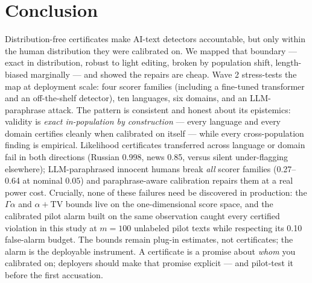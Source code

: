 \documentclass[11pt]{article}
\begin{document}
\section{Conclusion}
Distribution-free certificates make AI-text detectors accountable, but only within the human distribution they were calibrated on. We mapped that boundary --- exact in distribution, robust to light editing, broken by population shift, length-biased marginally --- and showed the repairs are cheap. Wave 2 stress-tests the map at deployment scale: four scorer families (including a fine-tuned transformer and an off-the-shelf detector), ten languages, six domains, and an LLM-paraphrase attack. The pattern is consistent and honest about its epistemics: validity is \emph{exact in-population by construction} --- every language and every domain certifies cleanly when calibrated on itself --- while every cross-population finding is empirical. Likelihood certificates transferred across language or domain fail in both directions (Russian 0.998, news 0.85, versus silent under-flagging elsewhere); LLM-paraphrased innocent humans break \emph{all} scorer families (0.27--0.64 at nominal $0.05$) and paraphrase-aware calibration repairs them at a real power cost. Crucially, none of these failures need be discovered in production: the $\Gamma\alpha$ and $\alpha+\mathrm{TV}$ bounds live on the one-dimensional score space, and the calibrated pilot alarm built on the same observation caught every certified violation in this study at $m=100$ unlabeled pilot texts while respecting its 0.10 false-alarm budget. The bounds remain plug-in estimates, not certificates; the alarm is the deployable instrument. A certificate is a promise about \emph{whom} you calibrated on; deployers should make that promise explicit --- and pilot-test it before the first accusation.
\end{document}
